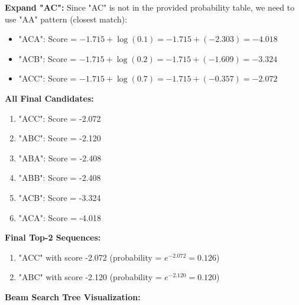 \documentclass[12pt]{article}
\begin{document}
\begin{enumerate}[(a)]
{    \textbf{Expand "AC":}
    Since "AC" is not in the provided probability table, we need to use "AA" pattern (closest match):
    \begin{itemize}
        \item "ACA": Score = $-1.715 + \log(0.1) = -1.715 + (-2.303) = -4.018$
        \item "ACB": Score = $-1.715 + \log(0.2) = -1.715 + (-1.609) = -3.324$
        \item "ACC": Score = $-1.715 + \log(0.7) = -1.715 + (-0.357) = -2.072$
    \end{itemize}
    
    \textbf{All Final Candidates:}
    \begin{enumerate}
        \item "ACC": Score = -2.072
        \item "ABC": Score = -2.120
        \item "ABA": Score = -2.408
        \item "ABB": Score = -2.408
        \item "ACB": Score = -3.324
        \item "ACA": Score = -4.018
    \end{enumerate}
    
    \textbf{Final Top-2 Sequences:}
    \begin{enumerate}
        \item "ACC" with score -2.072 (probability = $e^{-2.072} = 0.126$)
        \item "ABC" with score -2.120 (probability = $e^{-2.120} = 0.120$)
    \end{enumerate}
    
    \textbf{Beam Search Tree Visualization:}
    \begin{center}
\end{center}}
\end{enumerate}
\end{document}
